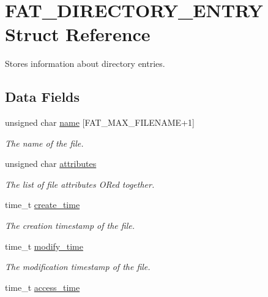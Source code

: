 \hypertarget{struct_f_a_t___d_i_r_e_c_t_o_r_y___e_n_t_r_y}{\section{F\-A\-T\-\_\-\-D\-I\-R\-E\-C\-T\-O\-R\-Y\-\_\-\-E\-N\-T\-R\-Y Struct Reference}
\label{struct_f_a_t___d_i_r_e_c_t_o_r_y___e_n_t_r_y}
}


Stores information about directory entries.  


\subsection*{Data Fields}
\begin{DoxyCompactItemize}
\item 
unsigned char \hyperlink{struct_f_a_t___d_i_r_e_c_t_o_r_y___e_n_t_r_y_ac2842750bc760b5291e4009eeed57ed7}{name} \mbox{[}F\-A\-T\-\_\-\-M\-A\-X\-\_\-\-F\-I\-L\-E\-N\-A\-M\-E+1\mbox{]}
\begin{DoxyCompactList}\small\item\em The name of the file.\end{DoxyCompactList}\item 
unsigned char \hyperlink{struct_f_a_t___d_i_r_e_c_t_o_r_y___e_n_t_r_y_a2440761584d6362f7b1a57e5844c8b2e}{attributes}
\begin{DoxyCompactList}\small\item\em The list of file attributes O\-Red together.\end{DoxyCompactList}\item 
time\-\_\-t \hyperlink{struct_f_a_t___d_i_r_e_c_t_o_r_y___e_n_t_r_y_aad4b4bd5118b2cfb35ec802726475d1f}{create\-\_\-time}
\begin{DoxyCompactList}\small\item\em The creation timestamp of the file.\end{DoxyCompactList}\item 
time\-\_\-t \hyperlink{struct_f_a_t___d_i_r_e_c_t_o_r_y___e_n_t_r_y_a3498295ba295779e74ff1d20f724aac1}{modify\-\_\-time}
\begin{DoxyCompactList}\small\item\em The modification timestamp of the file.\end{DoxyCompactList}\item 
time\-\_\-t \hyperlink{struct_f_a_t___d_i_r_e_c_t_o_r_y___e_n_t_r_y_a156d9e92fdcb395338c433dcf32e4e19}{access\-\_\-time}

\end{DoxyCompactItemize}
